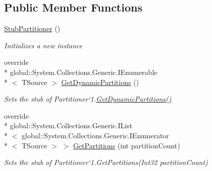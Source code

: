 \subsection*{Public Member Functions}
\begin{DoxyCompactItemize}
\item 
\hyperlink{class_system_1_1_collections_1_1_concurrent_1_1_fakes_1_1_stub_partitioner_3_01_t_source_01_4_af19d34c427a01eb44b13ef76422293f7}{Stub\-Partitioner} ()
\begin{DoxyCompactList}\small\item\em Initializes a new instance\end{DoxyCompactList}\item 
override \\*
global\-::\-System.\-Collections.\-Generic.\-I\-Enumerable\\*
$<$ T\-Source $>$ \hyperlink{class_system_1_1_collections_1_1_concurrent_1_1_fakes_1_1_stub_partitioner_3_01_t_source_01_4_a6732f39d910198eed65fa3b0d9d25af3}{Get\-Dynamic\-Partitions} ()
\begin{DoxyCompactList}\small\item\em Sets the stub of Partitioner`1.\hyperlink{class_system_1_1_collections_1_1_concurrent_1_1_fakes_1_1_stub_partitioner_3_01_t_source_01_4_a6732f39d910198eed65fa3b0d9d25af3}{Get\-Dynamic\-Partitions()}\end{DoxyCompactList}\item 
override \\*
global\-::\-System.\-Collections.\-Generic.\-I\-List\\*
$<$ global\-::\-System.\-Collections.\-Generic.\-I\-Enumerator\\*
$<$ T\-Source $>$ $>$ \hyperlink{class_system_1_1_collections_1_1_concurrent_1_1_fakes_1_1_stub_partitioner_3_01_t_source_01_4_afc12017620850fa7d7f399a796eec634}{Get\-Partitions} (int partition\-Count)
\begin{DoxyCompactList}\small\item\em Sets the stub of Partitioner`1.Get\-Partitions(\-Int32 partition\-Count)\end{DoxyCompactList}\end{DoxyCompactItemize}
